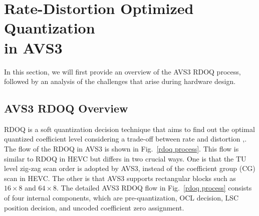 \documentclass[lettersize,journal]{IEEEtran}
\begin{document}
\section{Rate-Distortion Optimized Quantization \\ in AVS3}
\label{sec:2}
In this section, we will first provide an overview of the AVS3 RDOQ process, followed by an analysis of the challenges that arise during hardware design. 
\subsection{AVS3 RDOQ Overview}
\label{sec:2A}
RDOQ is a soft quantization decision technique that aims to find out the optimal quantized coefficient level considering a trade-off between rate and distortion  \cite{zhao2023scanline},\cite{huang2023rate}. The flow of the RDOQ in AVS3 is shown in Fig.~\ref{rdoq process}. This flow is similar to RDOQ in HEVC \cite{cui2017Laplacedistributionbased} but differs in two crucial ways. One is that the TU level zig-zag scan order is adopted by AVS3, instead of the coefficient group (CG) scan in HEVC. The other is that AVS3 supports rectangular blocks such as $16\times8$ and $64\times8$. The detailed AVS3 RDOQ flow in Fig.~\ref{rdoq process} consists of four internal components, which are pre-quantization, OCL decision, LSC position decision, and uncoded coefficient zero assignment. 
\par
\end{document}
